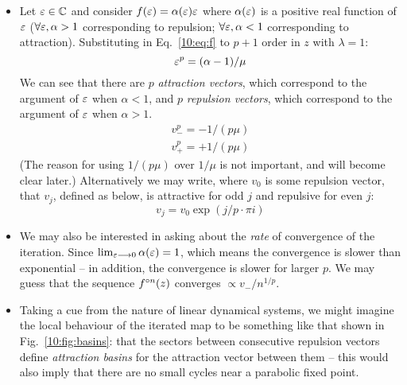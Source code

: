 \documentclass[../main.tex]{subfiles}
\begin{document}
\begin{itemize}
    \item Let $\varepsilon \in \mathbb{C}$ and consider $f(\varepsilon)=\alpha(\varepsilon)\varepsilon$ where $\alpha(\varepsilon)$ is a positive real function of $\varepsilon$ ($\forall \varepsilon, \alpha > 1$ corresponding to repulsion; $\forall \varepsilon, \alpha < 1$ corresponding to attraction). Substituting in Eq.~\ref{10:eq:f} to $p+1$ order in $z$ with $\lambda=1$:
    \begin{equation*}
        {\ensuremath{\varepsilon}^p} = (\alpha  - 1)/\mu 
    \end{equation*} 
    We can see that there are $p$ \emph{attraction vectors}, which correspond to the argument of $\varepsilon$ when $\alpha < 1$, and $p$ \emph{repulsion vectors}, which correspond to the argument of $\varepsilon$ when $\alpha > 1$. 
    \begin{equation}
        \label{10:eq:v1}
        \begin{array}{*{20}{c}}
            {v_ - ^p =  - 1/(p \mu) } \\
            {v_ + ^p =  + 1/(p \mu) }
        \end{array}    
    \end{equation}
    (The reason for using $1/(p \mu)$ over $1/\mu$ is not important, and will become clear later.)
    Alternatively we may write, where $v_0$ is some repulsion vector, that $v_j$, defined as below, is attractive for odd $j$ and repulsive for even $j$: 
    \begin{equation}
        \label{10:eq:v2}
        v_j = v_0 \exp\left(j/ p \cdot \pi i\right)
    \end{equation}
    \item We may also be interested in asking about the \emph{rate} of convergence of the iteration. Since $\lim_{\varepsilon\longrightarrow 0}\alpha(\varepsilon) = 1$, which means the convergence is slower than exponential -- in addition, the convergence is slower for larger $p$. We may guess that the sequence $f^{\circ n}(z)$ converges $\propto v_-/n^{1/p}$.
    \item Taking a cue from the nature of linear dynamical systems, we might imagine the local behaviour of the iterated map to be something like that shown in Fig.~\ref{10:fig:basins}: that the sectors between consecutive repulsion vectors define \emph{attraction basins} for the attraction vector between them -- this would also imply that there are no small cycles near a parabolic fixed point.
\end{itemize}
\end{document}
